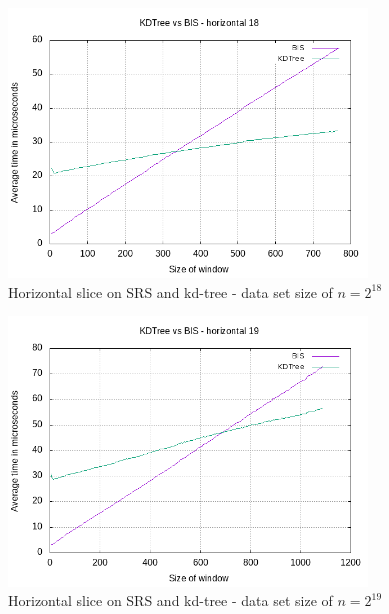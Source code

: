 \begin{figure}[h]
    \centering
    \includegraphics[width = 0.85\textwidth]{pictures/analysis/hori_18.png}
    \caption{Horizontal slice on SRS and kd-tree - data set size of $n=2^{18}$}\label{fig:hori_18}
\end{figure}

\begin{figure}[h]
    \centering
    \includegraphics[width = 0.85\textwidth]{pictures/analysis/hori_19.png}
    \caption{Horizontal slice on SRS and kd-tree - data set size of $n=2^{19}$}\label{fig:hori_19}
\end{figure}

